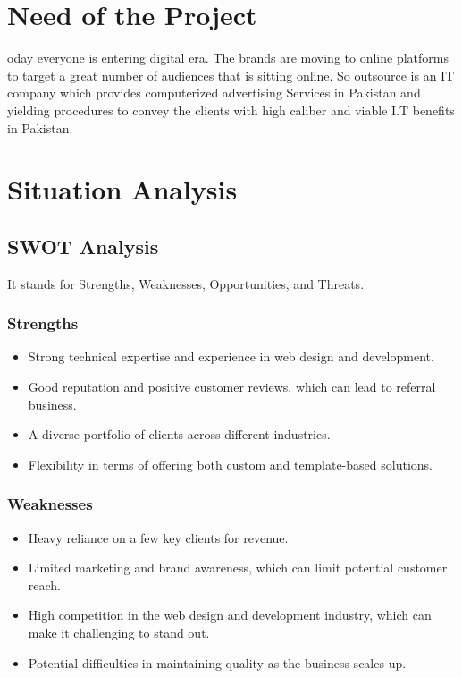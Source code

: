 \documentclass[12pt,a4paper]{article}
\begin{document}
	
 
 \clearpage
\tableofcontents
\clearpage
\section{Need of the Project}
\lettrine[findent=2pt]{}{}oday everyone is entering digital era. The brands are moving to online platforms to target a great number of audiences that is sitting online. So outsource is an IT company which provides computerized advertising Services in Pakistan and yielding procedures to convey the clients with high caliber and viable I.T benefits in Pakistan.
\section{Situation Analysis}
\subsection{SWOT Analysis}
It stands for Strengths, Weaknesses, Opportunities, and Threats.
\subsubsection{Strengths}
\begin{itemize}
    \item Strong technical expertise and experience in web design and development.
    \item Good reputation and positive customer reviews, which can lead to referral business.
    \item A diverse portfolio of clients across different industries.
    \item Flexibility in terms of offering both custom and template-based solutions.     
\end{itemize}
\subsubsection{Weaknesses}
\begin{itemize}
    \item Heavy reliance on a few key clients for revenue.
    \item Limited marketing and brand awareness, which can limit potential customer reach.
    \item High competition in the web design and development industry, which can make it challenging to stand out.  
    \item Potential difficulties in maintaining quality as the business scales up.
\end{itemize}
\end{document}
